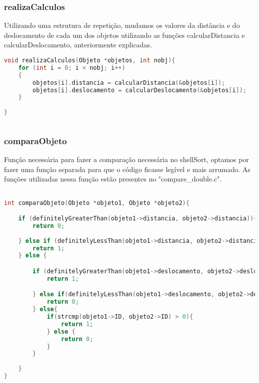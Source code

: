\documentclass{article}
\begin{document}
\subsubsection{realizaCalculos}

Utilizando uma estrutura de repetição, mudamos os valores da distância e do deslocamento de cada um dos objetos utilizando as funções calcularDistancia e calcularDeslocamento, anteriormente explicadas.

\begin{lstlisting}[caption={Função realizaCalculos},label={lst:cod7},language=C]
void realizaCalculos(Objeto *objetos, int nobj){
    for (int i = 0; i < nobj; i++)
    {
        objetos[i].distancia = calcularDistancia(&objetos[i]);
        objetos[i].deslocamento = calcularDeslocamento(&objetos[i]);
    }
   
}
    
\end{lstlisting}

\subsubsection{comparaObjeto}

Função necessária para fazer a comparação necessária no shellSort, optamos por fazer uma função separada para que o código ficasse
legível e mais arrumado. As funções utilizadas nessa função estão presentes no "compare\_double.c".

\begin{lstlisting}[caption={Função comparaObjetos},label={lst:cod7},language=C]

int comparaObjeto(Objeto *objeto1, Objeto *objeto2){

    if (definitelyGreaterThan(objeto1->distancia, objeto2->distancia)){
        return 0;
        
    } else if (definitelyLessThan(objeto1->distancia, objeto2->distancia)){
        return 1;
    } else {

        if (definitelyGreaterThan(objeto1->deslocamento, objeto2->deslocamento)) {
            return 1;

        } else if(definitelyLessThan(objeto1->deslocamento, objeto2->deslocamento)){
            return 0;
        } else{
            if(strcmp(objeto1->ID, objeto2->ID) > 0){
                return 1;
            } else {
                return 0;
            }
        }
        
    }
}
    
\end{lstlisting}
\end{document}
